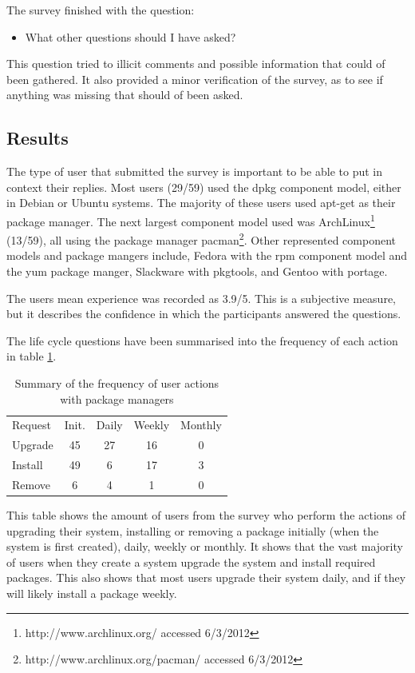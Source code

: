 The survey finished with the question:
\begin{itemize}
  \item What other questions should I have asked?
\end{itemize}
This question tried to illicit comments and possible information that could of been gathered.
It also provided a minor verification of the survey, as to see if anything was missing that should of been asked.

\subsection{Results}
The type of user that submitted the survey is important to be able to put in context their replies.
Most users (29/59) used the dpkg component model, either in Debian or Ubuntu systems.
The majority of these users used apt-get as their package manager.
The next largest component model used was ArchLinux\footnote{http://www.archlinux.org/ accessed 6/3/2012} (13/59),
all using the package manager pacman\footnote{http://www.archlinux.org/pacman/ accessed 6/3/2012}.
Other represented component models and package mangers include, Fedora with the rpm component model and the yum package manger,
Slackware with pkgtools, and Gentoo with portage.

The users mean experience was recorded as 3.9/5.
This is a subjective measure, but it describes the confidence in which the participants answered the questions. 

The life cycle questions have been summarised into the frequency of each action in table \ref{strat.tblaction}.

\begin{table}[htp]
\begin{tabular}{l | c | c | c | c |}
Request & Init. & Daily & Weekly & Monthly \\
Upgrade  & 45 & 27 & 16 & 0 \\
Install & 49 & 6 & 17 & 3 \\
Remove & 6 & 4 & 1 & 0\\
\end{tabular}
\caption{Summary of the frequency of user actions with package managers}
\label{strat.tblaction}
\end{table}

This table shows the amount of users from the survey who perform the actions of upgrading their system, installing or removing a package 
initially (when the system is first created), daily, weekly or monthly.
It shows that the vast majority of users when they create a system upgrade the system and install required packages.
This also shows that most users upgrade their system daily, and if they will likely install a package weekly.

